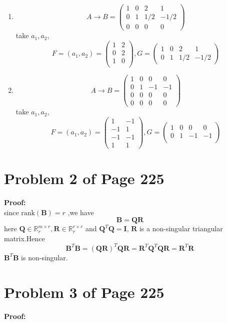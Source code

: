 \documentclass[12pt,a4paper]{article}
\newcommand{\mysection}[2]{
\section{Problem #1 of Page #2}	
	}
\begin{document}
\begin{enumerate}[(1)]
	\item  \[
		A \rightarrow B = \left( \begin{array}{cccc}
		1 & 0 & 2 & 1\\
		0 & 1 & 1/2 & -1/2 \\
		0 & 0 & 0 & 0	
	\end{array} 		\right) 
	\]
  take $a_1,a_2$, 	
  \[
	  F = (a_1, a_2) = \left( \begin{array}{cc}
	  1 & 2\\
	  0 & 2\\
	  1 & 0 \\
	  \end{array}\right) ,
	  G = \left( \begin{array}{cccc}
		  1 & 0 & 2 & 1\\
		  0 & 1 & 1/2 & -1/2
	  \end{array} \right) 
  \]
 \item 
 \[
 A \rightarrow B = \left( \begin{array}{cccc}
 1 & 0 & 0 & 0\\
 0 & 1 & -1 & -1 \\
 0 & 0 & 0 & 0 \\
 0 & 0 & 0 & 0 
 \end{array} 		\right) 
 \]
 take $a_1,a_2$, 	
 \[
 F = (a_1, a_2) = \left( \begin{array}{cc}
 1 & -1\\
 -1 & 1\\
 -1 & -1 \\
 1 & 1
 \end{array}\right) ,
 G = \left( \begin{array}{cccc}
 1 & 0 & 0 & 0\\
 0 & 1 & -1 & -1 \\
 \end{array} \right) 
 \]
	
\end{enumerate}
\mysection{2}{225}
\textbf{Proof:} \\
since $\text{rank}(\bm{B}) = r$ ,we have
\[
	\bm{B} = \bm{QR}
\]
here $\bm{Q} \in \mathbb{R}_r^{m\times r}, \bm{R} \in \mathbb{R}_r^{r\times r}$ and
$\bm{Q}^T\bm{Q} = \bm{I}$, $\bm{R}$ is a non-singular triangular matrix.Hence
\[
	\bm{B}^T\bm{B} = (\bm{QR})^T\bm{QR} = \bm{R}^T\bm{Q}^T\bm{QR} = \bm{R}^T\bm{R}
\]
$\bm{B}^T\bm{B}$ is non-singular.
\mysection{3}{225}
\textbf{Proof:}
\end{document}
